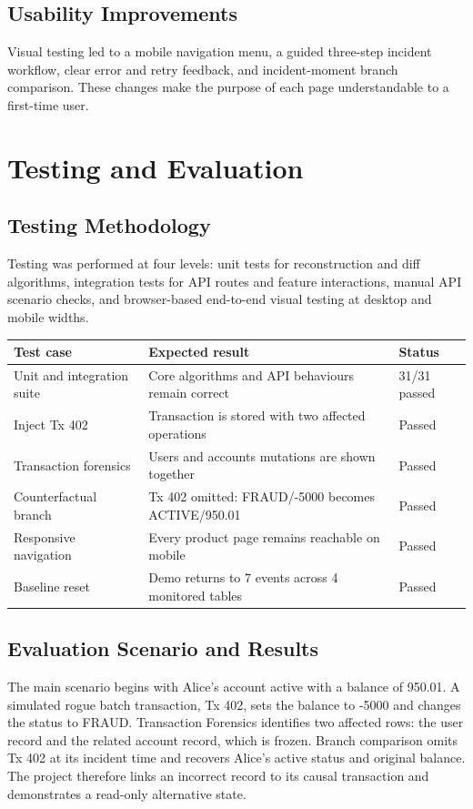 \documentclass{tietreport}
\begin{document}
\section{Usability Improvements}
Visual testing led to a mobile navigation menu, a guided three-step incident workflow, clear error and retry feedback, and incident-moment branch comparison. These changes make the purpose of each page understandable to a first-time user.

\chapter{Testing and Evaluation}
\section{Testing Methodology}
Testing was performed at four levels: unit tests for reconstruction and diff algorithms, integration tests for API routes and feature interactions, manual API scenario checks, and browser-based end-to-end visual testing at desktop and mobile widths.

\begin{center}
\begin{tabular}{p{}p{}p{}}
\toprule
Test case & Expected result & Status \\
\midrule
Unit and integration suite & Core algorithms and API behaviours remain correct & 31/31 passed \\
Inject Tx 402 & Transaction is stored with two affected operations & Passed \\
Transaction forensics & Users and accounts mutations are shown together & Passed \\
Counterfactual branch & Tx 402 omitted: FRAUD/-5000 becomes ACTIVE/950.01 & Passed \\
Responsive navigation & Every product page remains reachable on mobile & Passed \\
Baseline reset & Demo returns to 7 events across 4 monitored tables & Passed \\
\bottomrule
\end{tabular}
\end{center}

\section{Evaluation Scenario and Results}
The main scenario begins with Alice's account active with a balance of 950.01. A simulated rogue batch transaction, Tx 402, sets the balance to -5000 and changes the status to FRAUD. Transaction Forensics identifies two affected rows: the user record and the related account record, which is frozen. Branch comparison omits Tx 402 at its incident time and recovers Alice's active status and original balance. The project therefore links an incorrect record to its causal transaction and demonstrates a read-only alternative state.
\end{document}
